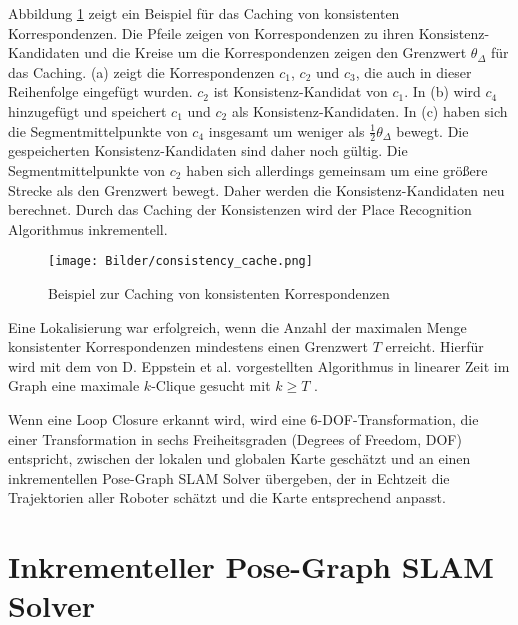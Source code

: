 Abbildung \ref{fig:cache} zeigt ein Beispiel für das Caching von konsistenten Korrespondenzen. Die Pfeile zeigen von Korrespondenzen zu ihren Konsistenz-Kandidaten und die Kreise um die Korrespondenzen zeigen den Grenzwert $ \theta _\Delta $ für das Caching. (a) zeigt  die Korrespondenzen $ c_1 $, $ c_2 $ und $ c_3 $, die auch in dieser Reihenfolge eingefügt wurden. $ c_2 $ ist Konsistenz-Kandidat von $ c_1 $. In (b) wird $ c_4 $ hinzugefügt und speichert $ c_1 $ und $ c_2 $ als Konsistenz-Kandidaten. In (c) haben sich die Segmentmittelpunkte von $ c_4 $ insgesamt um weniger als $ \frac{1}{2}\theta _\Delta $ bewegt. Die gespeicherten Konsistenz-Kandidaten sind daher noch gültig. Die Segmentmittelpunkte von $ c_2 $ haben sich allerdings gemeinsam um eine größere Strecke als den Grenzwert bewegt. Daher werden die Konsistenz-Kandidaten neu berechnet. Durch das Caching der Konsistenzen wird der Place Recognition Algorithmus inkrementell. 

\begin{figure}
    \centering
    \texttt{[image: Bilder/consistency\_cache.png]}
    \caption{Beispiel zur Caching von konsistenten Korrespondenzen \cite{Dube2018}}
    \label{fig:cache}
\end{figure}

%

Eine Lokalisierung war erfolgreich, wenn die Anzahl der maximalen Menge  konsistenter Korrespondenzen mindestens einen Grenzwert $ T $ erreicht. Hierfür wird mit dem von D. Eppstein et al. vorgestellten Algorithmus in linearer Zeit im Graph eine maximale $ k $-Clique gesucht mit $ k\geq T $ \cite{Eppstein2010}. 

Wenn eine Loop Closure erkannt wird, wird eine 6-DOF-Transformation, die einer Transformation in sechs Freiheitsgraden (Degrees of Freedom, DOF) entspricht, zwi\-schen der lokalen und globalen Karte geschätzt und an einen inkrementellen Pose-Graph SLAM Solver übergeben, der in Echtzeit die Trajektorien aller Roboter schätzt und die Karte entsprechend anpasst. 

\section[Inkrementeller Pose-Graph SLAM Solver (Kopp)]{Inkrementeller Pose-Graph SLAM Solver}


